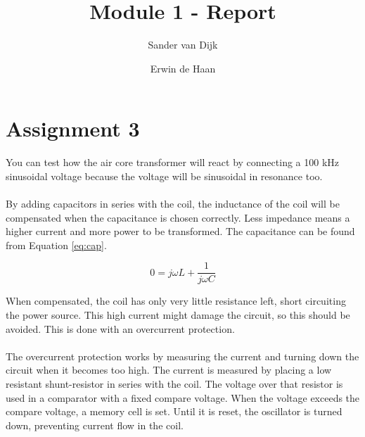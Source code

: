 \documentclass[final]{scrreprt} %
\title{Module 1 - Report}
\author{Sander {van Dijk} \and Erwin {de Haan}}
\begin{document}
\chapter*{Assignment 3}
You can test how the air core transformer will react by connecting a 100 kHz sinusoidal voltage because the voltage will be sinusoidal in resonance too.
\\ \\ 
By adding capacitors in series with the coil, the inductance of the coil will be compensated when the capacitance is chosen correctly. Less impedance means a higher current and more power to be transformed. The capacitance can be found from Equation \ref{eq:cap}.

\begin{equation}
	0 = j \omega L + \frac{1}{j \omega C}
	\label{eq:cap}
\end{equation}

When compensated, the coil has only very little resistance left, short circuiting the power source. This high current might damage the circuit, so this should be avoided. This is done with an overcurrent protection.
\\ \\
The overcurrent protection works by measuring the current and turning down the circuit when it becomes too high. The current is measured by placing a low resistant shunt-resistor in series with the coil. The voltage over that resistor is used in a comparator with a fixed compare voltage. When the voltage exceeds the compare voltage, a memory cell is set. Until it is reset, the oscillator is turned down, preventing current flow in the coil.
\end{document}
